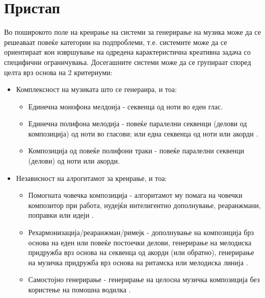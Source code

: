 \chapter{Пристап}
\label{ch:pristap}

Во поширокото поле на креирање на системи за генерирање на музика може да се решеаваат повеќе категории на подпроблеми, т.е. системите може да се ориентираат кон извршување на одредена карактеристична креативна задача со специфични ограничувања. Досегашните системи може да се групираат според целта врз основа на 2 критериуми:
\begin{itemize}
    \item Комплексност на музиката што се генераира, и тоа: \begin{itemize}
        \item Единечна монофона мелдоија - секвенца од ноти во еден глас. \cite{Biles1994,Cope1991,Zils2001,GarciaSalas2011,Schwarz2006,Eck2002,Eck2008,Tikhonov2017,Sturm2016,Bretan2016}
        \item Единечна полифона мелодија - повеќе паралелни секвенци (делови од композиција) од ноти во гласови; или една секвенца од ноти или акорди \cite{Hadjeres2016,Boulanger-Lewandowski2012, Boulanger-Lewandowski2014,Goel2014,Liang2017}.
        \item Композиција од повеќе полифони траки - повеќе паралелни секвенци (делови) од ноти или акорди. \cite{Yang2017,Dong2017,Dong2018,Johnson2017}
    \end{itemize}
    \item Независност на алрогитамот за креирање, и тоа: \begin{itemize}
        \item Помогната човечка композиција - алгоритамот му помага на човечки композитор при работа, нудејќи интелигентно дополнување, реаранжмани, поправки или идеји \cite{Ghedini2015}.
        \item Рехармонизација/реаранжман/римејк - дополнување на композиција брз основа на еден или повеќе постоечки делови, генерирање на мелодиска придружба врз основа на секвенца од акорди (или обратно), генерирање на музичка придружба врз основа на ритамска или мелодиска линија \cite{Hadjeres2016,Liang2017}.
        \item Самостојно генерирање - генерирање на целосна музичка композиција без користење на помошна водилка \cite{Boulanger-Lewandowski2012, Boulanger-Lewandowski2014,Goel2014,Yang2017,Dong2017,Dong2018,Johnson2017}.
    \end{itemize}
\end{itemize}


